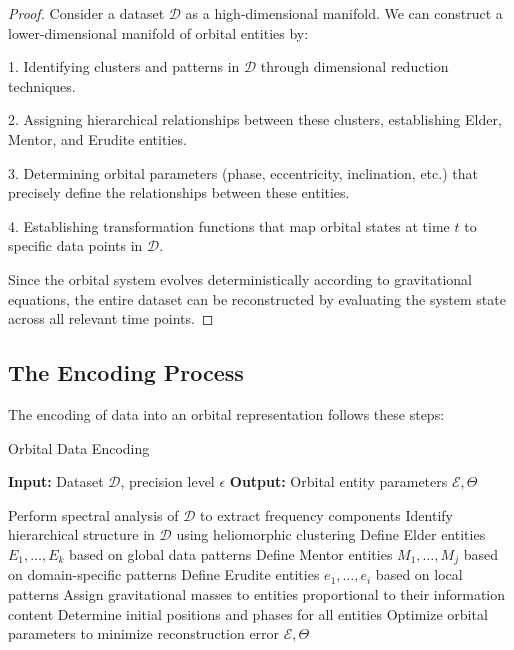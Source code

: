 \begin{proof}
Consider a dataset $\mathcal{D}$ as a high-dimensional manifold. We can construct a lower-dimensional manifold of orbital entities by:

1. Identifying clusters and patterns in $\mathcal{D}$ through dimensional reduction techniques.

2. Assigning hierarchical relationships between these clusters, establishing Elder, Mentor, and Erudite entities.

3. Determining orbital parameters (phase, eccentricity, inclination, etc.) that precisely define the relationships between these entities.

4. Establishing transformation functions that map orbital states at time $t$ to specific data points in $\mathcal{D}$.

Since the orbital system evolves deterministically according to gravitational equations, the entire dataset can be reconstructed by evaluating the system state across all relevant time points.
\end{proof}

\subsection{The Encoding Process}

The encoding of data into an orbital representation follows these steps:

\begin{algorithm}[h]
\caption{Orbital Data Encoding}
\begin{algorithmic}[1]
\State \textbf{Input:} Dataset $\mathcal{D}$, precision level $\epsilon$
\State \textbf{Output:} Orbital entity parameters $\mathcal{E}, \Theta$

\State Perform spectral analysis of $\mathcal{D}$ to extract frequency components
\State Identify hierarchical structure in $\mathcal{D}$ using heliomorphic clustering
\State Define Elder entities $E_1, \ldots, E_k$ based on global data patterns
\State Define Mentor entities $M_1, \ldots, M_j$ based on domain-specific patterns
\State Define Erudite entities $e_1, \ldots, e_i$ based on local patterns
\State Assign gravitational masses to entities proportional to their information content
\State Determine initial positions and phases for all entities
\State Optimize orbital parameters to minimize reconstruction error 
\State \Return $\mathcal{E}, \Theta$
\end{algorithmic}
\end{algorithm}

